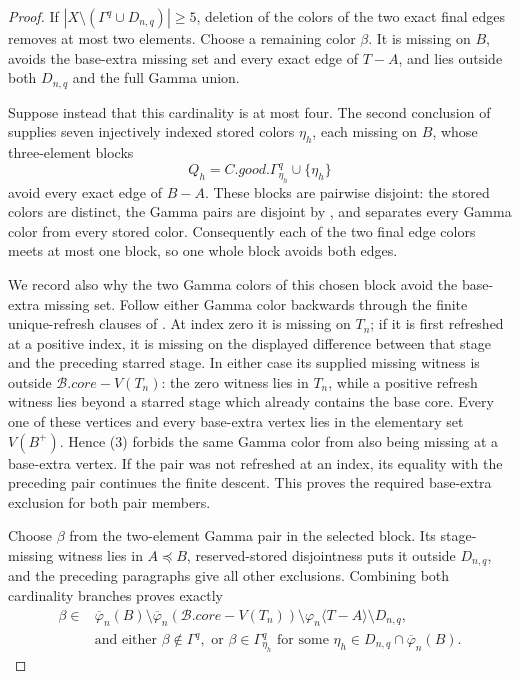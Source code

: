 \begin{proof}
If \(|X\setminus(\Gamma^q\cup D_{n,q})|\geq5\), deletion of the colors
of the two exact final edges removes at most two elements.  Choose a
remaining color \(\beta\).  It is missing on \(B\), avoids the base-extra
missing set and every exact edge of \(T-A\), and lies outside both
\(D_{n,q}\) and the full Gamma union.

Suppose instead that this cardinality is at most four.  The second
conclusion of  supplies seven injectively indexed stored
colors \(\eta_h\), each missing on \(B\), whose three-element blocks
\[
       Q_h=C.\mathit{good}.\Gamma^q_{\eta_h}\cup\{\eta_h\}
\]
avoid every exact edge of \(B-A\).  These blocks are pairwise disjoint:
the stored colors are distinct, the Gamma pairs are disjoint by
, and
 separates every Gamma color from
every stored color.  Consequently each of the two final edge colors meets
at most one block, so one whole block avoids both edges.

We record also why the two Gamma colors of this chosen block avoid the
base-extra missing set.  Follow either Gamma color backwards through the
finite unique-refresh clauses of .  At index zero
it is missing on \(T_n\); if it is first refreshed at a positive index,
it is missing on the displayed difference between that stage and the
preceding starred stage.  In either case its supplied missing witness is
outside \(\mathcal B.\mathit{core}-V(T_n)\): the zero witness lies in
\(T_n\), while a positive refresh witness lies beyond a starred stage
which already contains the base core.  Every one of these vertices and
every base-extra vertex lies in the elementary set \(V(B^+)\).  Hence
(3) forbids the same Gamma color from also being missing at a base-extra
vertex.  If the pair was not refreshed at an index, its equality with the
preceding pair continues the finite descent.  This proves the required
base-extra exclusion for both pair members.

Choose \(\beta\) from the two-element Gamma pair in the selected block.
Its stage-missing witness lies in \(A\preccurlyeq B\), reserved-stored
disjointness puts it outside \(D_{n,q}\), and the preceding paragraphs
give all other exclusions.  Combining both cardinality branches proves
exactly
\[
 \begin{split}
 \beta\in{}&\overline\varphi_n(B)
 \setminus\overline\varphi_n(\mathcal B.\mathit{core}-V(T_n))
 \setminus\varphi_n\langle T-A\rangle\setminus D_{n,q},\\
 &\text{and either }\beta\notin\Gamma^q,
 \text{ or }\beta\in\Gamma^q_{\eta_h}
 \text{ for some }\eta_h\in D_{n,q}\cap
       \overline\varphi_n(B).
 \end{split}                                                  \tag{16}
\]


\end{proof}
